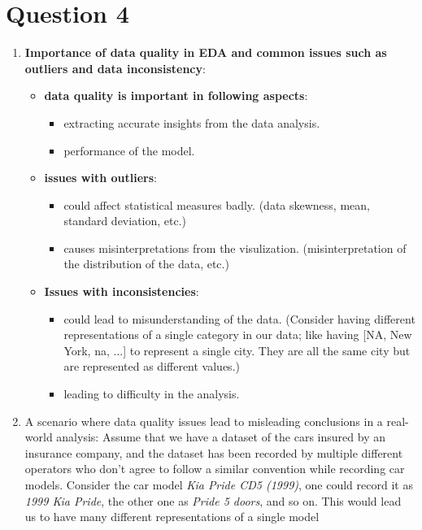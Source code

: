 \documentclass[a4paper,12pt]{article}
\begin{document}
\section*{Question 4}
\begin{enumerate}
    \item \textbf{Importance of data quality in EDA and common issues such as outliers and data inconsistency}:
    \begin{itemize}
        \item \textbf{data quality is important in following aspects}:
        \begin{itemize}
            \item extracting accurate insights from the data analysis.
            \item performance of the model.
        \end{itemize}
        \item \textbf{issues with outliers}:
        \begin{itemize}
            \item could affect statistical measures badly. (data skewness, mean, standard deviation, etc.)
            \item causes misinterpretations from the visulization. (misinterpretation of the distribution of the data, etc.)
        \end{itemize}
        \item \textbf{Issues with inconsistencies}:
        \begin{itemize}
            \item could lead to misunderstanding of the data. (Consider having different representations of a single category in our data; like having [NA, New York, na, ...] to represent
            a single city. They are all the same city but are represented as different values.)
            \item leading to difficulty in the analysis.
        \end{itemize}
    \end{itemize}
    \item A scenario where data quality issues lead to misleading conclusions in a real-world analysis:
    Assume that we have a dataset of the cars insured by an insurance company, and the dataset has been recorded by multiple different operators who don't agree to follow a similar convention
    while recording car models. Consider the car model \textit{Kia Pride CD5 (1999)}, one could record it as \textit{1999 Kia Pride}, the other one as \textit{Pride 5 doors}, and so on. This would lead us to have many different representations of a single model 

\end{enumerate}
\end{document}
